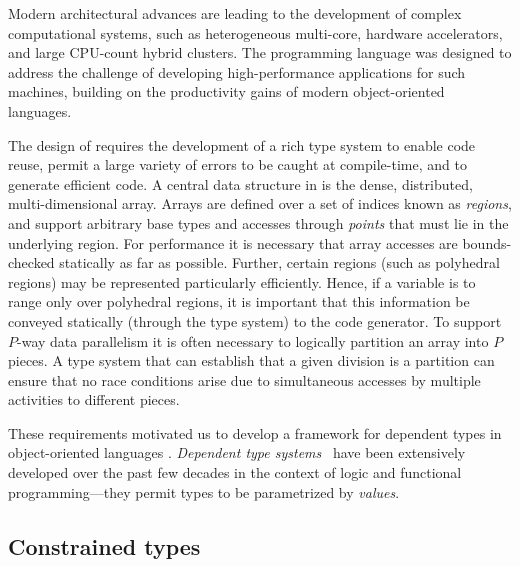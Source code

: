 

Modern architectural advances are leading to the development of
complex computational systems, such as heterogeneous multi-core,
hardware accelerators, and large CPU-count hybrid clusters.
The \Xten{} programming language \cite{X10-concur,x10-oopsla05,X10} was
designed to address the challenge of developing
high-performance applications for such machines, building on the
productivity gains of modern object-oriented languages.

The design of \Xten{} requires the development of a rich type system
to enable code reuse, permit a large variety of errors to be caught at
compile-time, and to generate efficient code.  A central
data structure in \Xten{} is the dense, distributed, multi-dimensional
array.  Arrays are defined over a set of indices known as \emph{regions},
and support arbitrary base types and accesses through {\em
points} that must lie in the underlying region. For performance it is
necessary that array accesses are
bounds-checked statically as far as possible.
Further, certain regions (such as
polyhedral regions) may be represented particularly
efficiently.  Hence, if a variable is to range only over
polyhedral regions, it is important that this information be conveyed
statically (through the type system) to the code 
generator. To support $P$-way data parallelism it is often necessary
to logically partition an array into $P$ pieces. A type system that
can establish that a given division is a partition can ensure that no
race conditions arise due to simultaneous accesses by
multiple activities to different pieces.

These requirements motivated us to develop a framework for dependent
types in object-oriented languages \cite{constrained-types}.  \emph{Dependent type
systems}~\cite{dependent-types,xi99dependent,ocrz-ecoop03,aspinall-attapl,cayenne,epigram-matter,calc-constructions}
have been extensively developed over the past few decades in the
context of logic and functional programming---they permit types to be
parametrized by \emph{values}.

\subsection{Constrained types}

